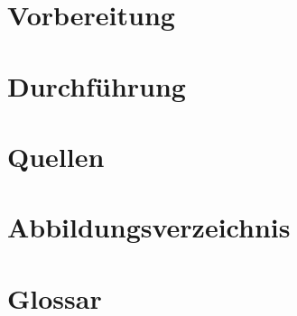 \documentclass[11pt]{article}
\begin{document}
    
    \pagebreak
    \tableofcontents
    \pagebreak
    \section{Vorbereitung}
    
    \pagebreak
    \section{Durchführung}
    
    \pagebreak
    \section{Quellen}
    
    \pagebreak
    \section{Abbildungsverzeichnis}
    
    \pagebreak
    \section{Glossar}
    
\end{document}
